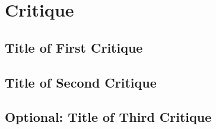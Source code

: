\section{Critique}



\subsection{Title of First Critique}


\subsection{Title of Second Critique}


\subsection{Optional: Title of Third Critique}


